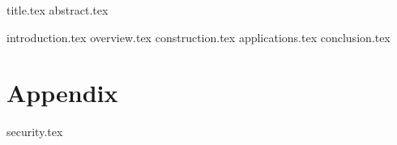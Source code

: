 \documentclass[11pt]{llncs}
\begin{document}
{title.tex}
\thispagestyle{plain}
{abstract.tex}

{introduction.tex}
{overview.tex}
{construction.tex}
\ifshort\else
{applications.tex}
\fi
{conclusion.tex}

\ifshort\else
\appendix
\section*{Appendix}
{security.tex}
\fi



\end{document}
